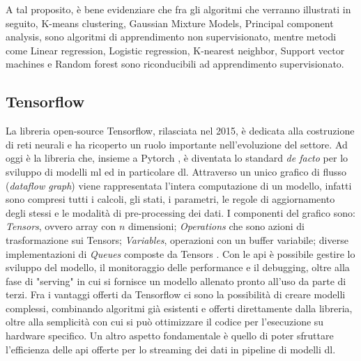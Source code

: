 \documentclass[12pt,a4paper,fleqn,titlepage]{report}
\begin{document}
        A tal proposito, è bene evidenziare che fra gli algoritmi che verranno illustrati in seguito, K-means clustering, Gaussian Mixture Models, Principal component analysis, sono algoritmi di apprendimento non supervisionato, mentre metodi come Linear regression, Logistic regression, K-nearest neighbor, Support vector machines e Random forest sono riconducibili ad apprendimento supervisionato.

        \subsection{Tensorflow}
        La libreria open-source Tensorflow, rilasciata nel 2015, è dedicata alla costruzione di reti neurali e ha ricoperto un ruolo importante nell'evoluzione del settore. Ad oggi è la libreria che, insieme a Pytorch \cite{paszke:2019}, è diventata lo standard \emph{de facto} per lo sviluppo di modelli \gls{ml} ed in particolare \gls{dl}.
        Attraverso un unico grafico di flusso (\emph{dataflow graph}) viene rappresentata l'intera computazione di un modello, infatti sono compresi tutti i calcoli, gli stati, i parametri, le regole di aggiornamento degli stessi e le modalità di pre-processing dei dati. I componenti del grafico sono: \emph{Tensors}, ovvero array con $n$ dimensioni; \emph{Operations} che sono azioni di trasformazione sui Tensors; \emph{Variables}, operazioni con un buffer variabile; diverse implementazioni di \emph{Queues} composte da Tensors \cite{abadi:2016}.
        Con le \gls{api} è possibile gestire lo sviluppo del modello, il monitoraggio delle performance e il debugging, oltre alla fase di "serving" in cui si fornisce un modello allenato pronto all'uso da parte di terzi.
        Fra i vantaggi offerti da Tensorflow ci sono la possibilità di creare modelli complessi, combinando algoritmi già esistenti e offerti direttamente dalla libreria, oltre alla semplicità con cui si può ottimizzare il codice per l'esecuzione su hardware specifico. Un altro aspetto fondamentale è quello di poter sfruttare l'efficienza delle \gls{api} offerte per lo streaming dei dati in pipeline di modelli \gls{dl}.
\end{document}
